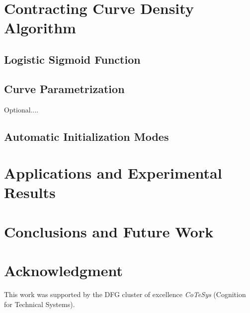 \documentclass[conference]{IEEEtran}
\begin{document}
\section{Contracting Curve Density Algorithm}

\subsection{Logistic Sigmoid Function}

\subsection{Curve Parametrization}
Optional....

\subsection{Automatic Initialization Modes}

\section{Applications and Experimental Results}

\section{Conclusions and Future Work}

\section*{Acknowledgment}
 This work was supported by the DFG cluster of excellence \emph{CoTeSys} (Cognition for Technical Systems).


\end{document}
